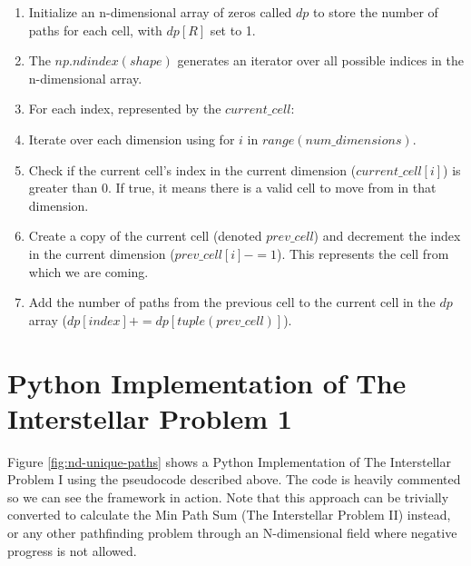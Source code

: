 \begin{enumerate}
    \item Initialize an n-dimensional array of zeros called $dp$ to store the number of paths for each cell, with $dp[R]$ set to 1.
    \item The $np.ndindex(shape)$ generates an iterator over all possible indices in the n-dimensional array.
    \item For each index, represented by the $current\_cell$:
    \item Iterate over each dimension using for $i$ in $range(num\_dimensions)$.
    \item Check if the current cell's index in the current dimension ($current\_cell[i]$) is greater than 0. If true, it means there is a valid cell to move from in that dimension.
    \item Create a copy of the current cell (denoted $prev\_cell$) and decrement the index in the current dimension ($prev\_cell[i] -= 1$). This represents the cell from which we are coming.
    \item Add the number of paths from the previous cell to the current cell in the $dp$ array ($dp[index] += dp[tuple(prev\_cell)]$).

\end{enumerate}

\section{Python Implementation of The Interstellar Problem 1}

Figure \ref{fig:nd-unique-paths} shows a Python Implementation of The Interstellar Problem I using the pseudocode described above.
The code is heavily commented so we can see the framework in action. Note that this approach can be trivially converted to calculate the Min Path Sum (The Interstellar Problem II) instead, or any other pathfinding problem through an N-dimensional field where negative progress is not allowed.

